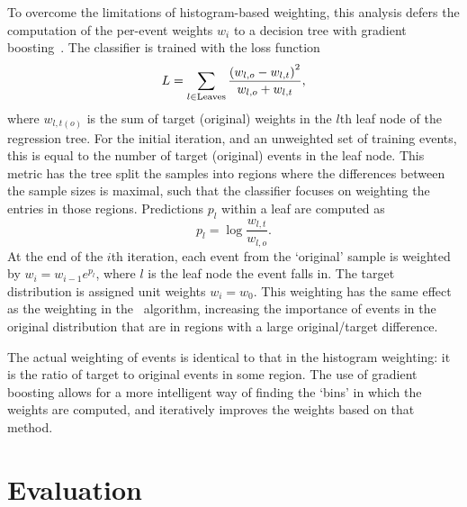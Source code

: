 To overcome the limitations of histogram-based weighting, this analysis defers 
the computation of the per-event weights $w_{i}$ to a decision tree with 
gradient boosting~\cite{Rogozhnikov:2016bdp}.
The classifier is trained with the loss function
\begin{equation}
  L = \sum_{l \in \text{Leaves}} \frac{%
    {(w_{l,o} - w_{l,t})}^{2}
  }{%
    w_{l,o} + w_{l,t}
  },
\end{equation}
where $w_{l,t(o)}$ is the sum of target (original) weights in the $l$th leaf 
node of the regression tree.
For the initial iteration, and an unweighted set of training events, this is 
equal to the number of target (original) events in the leaf node.
This metric has the tree split the samples into regions where the differences 
between the sample sizes is maximal, such that the classifier focuses on 
weighting the entries in those regions.
Predictions $p_{l}$ within a leaf are computed as
\begin{equation}
  p_{l} = \log{\frac{w_{l,t}}{w_{l,o}}}.
\end{equation}
At the end of the $i$th iteration, each event from the `original' sample is 
weighted by $w_{i} = w_{i - 1}e^{p_{l}}$, where $l$ is the leaf node the event 
falls in.
The target distribution is assigned unit weights $w_{i} = w_{0}$.
This weighting has the same effect as the weighting in the \adaboost\ 
algorithm, increasing the importance of events in the original distribution 
that are in regions with a large original/target difference.

The actual weighting of events is identical to that in the histogram weighting: 
it is the ratio of target to original events in some region.
The use of gradient boosting allows for a more intelligent way of finding the 
`bins' in which the weights are computed, and iteratively improves the weights 
based on that method.

\section{Evaluation}
\label{chap:cpv:kinematic_weighting:evaluation}


